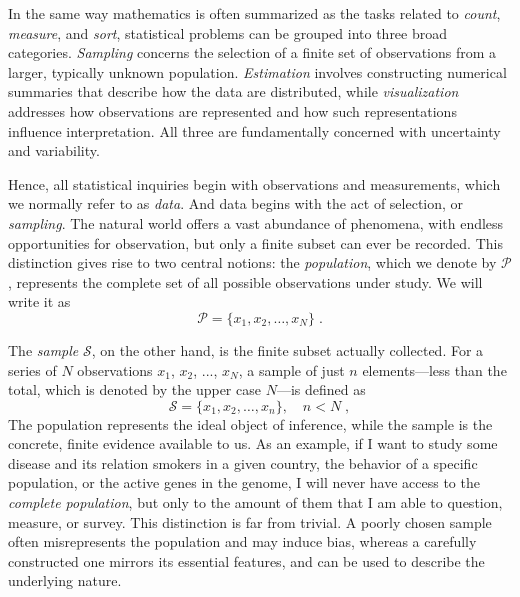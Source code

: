 \medskip

In the same way mathematics is often summarized as the tasks related to \textit{count}, \textit{measure}, and \textit{sort}, statistical problems can be grouped into three broad categories. \textit{Sampling} concerns the selection of a finite set of observations from a larger, typically unknown population. \textit{Estimation} involves constructing numerical summaries that describe how the data are distributed, while \textit{visualization} addresses how observations are represented and how such representations influence interpretation. All three are fundamentally concerned with uncertainty and variability.

\medskip

Hence, all statistical inquiries begin with observations and measurements, which we normally refer to as \textit{data}. And data begins with the act of selection, or \textit{sampling}. The natural world offers a vast abundance of phenomena, with endless opportunities for observation, but only a finite subset can ever be recorded. This distinction gives rise to two central notions: the \textit{population}, which we denote by $\mathcal{P}$, represents the complete set of all possible observations under study. We will write it as
\begin{equation}
	\mathcal{P} = \{x_1, x_2, \dots, x_N\} \; .
\end{equation}

The \textit{sample} $\mathcal{S}$, on the other hand, is the finite subset actually collected. For a series of $N$ observations $x_1$, $x_2$, ..., $x_N$, a sample of just $n$ elements—less than the total, which is denoted by the upper case $N$—is defined as
\begin{equation}
	\mathcal{S} = \{x_1, x_2, \dots, x_n\}, \quad n < N \; ,
\end{equation}
The population represents the ideal object of inference, while the sample is the concrete, finite evidence available to us.  As an example, if I want to study some disease and its relation smokers in a given country, the behavior of a specific population, or the active genes in the genome, I will never have access to the \textit{complete population}, but only to the amount of them that I am able to question, measure, or survey. This distinction is far from trivial. A poorly chosen sample often misrepresents the population and may induce bias, whereas a carefully constructed one mirrors its essential features, and can be used to describe the underlying nature.

